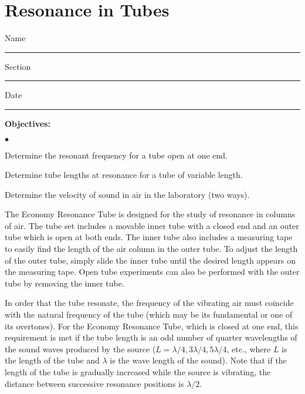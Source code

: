 
\section{Resonance in Tubes}

Name \rule{2.0in}{0.1pt}\hfill{}Section \rule{1.0in}{0.1pt}\hfill{}Date \rule{1.0in}{0.1pt}



{\noindent \bf Objectives:} \begin{list}{$\bullet$}{\itemsep0pt }

\item Determine the resonant frequency for a tube open at one end.

\item Determine tube lengths at resonance for a tube of variable length.

\item Determine the velocity of sound in air in the laboratory (two ways).

\end{list}


The Economy Resonance Tube is designed for the study of resonance in columns of air.  The tube set includes a movable inner tube with a closed end and an outer tube which is open at both ends.  The inner tube also includes a measuring tape to easily find the length of the air column in the outer tube.  To adjust the length of the outer tube, simply slide the inner tube until the desired length appears on the measuring tape.  Open tube experiments can also be performed with the outer tube by removing the inner tube.

\noindent In order that the tube resonate, the frequency of the vibrating air must coincide with the natural frequency of the tube (which may be its fundamental or one of its overtones). For the Economy Resonance Tube, which is closed at one end, this requirement is met if the tube length is an odd number of quarter wavelengths of the sound waves produced by the source ($L = \lambda/4, 3 \lambda/4, 5 \lambda/4$, etc., where $L$ is the length of the tube and $\lambda$ is the wave length of the sound). Note that if the length of the tube is gradually increased while the source is vibrating, the distance between successive resonance positions is $\lambda/2$. \\

 \\


